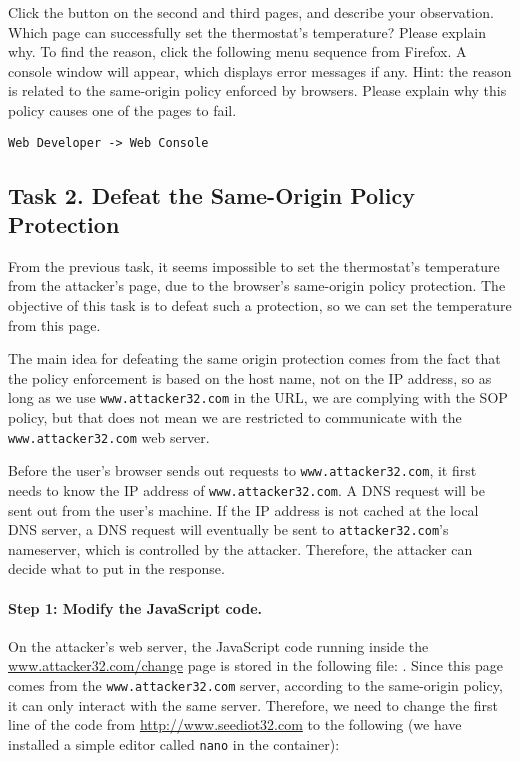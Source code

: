 Click the button on the second and third pages, and describe your observation. Which page
can successfully set the thermostat's temperature? Please explain why. 
To find the reason, click the following menu sequence from Firefox. A console window will appear,
which displays error messages if any. Hint: the reason is related to the same-origin policy 
enforced by browsers. Please explain why this policy causes one of the pages to fail.
 
\begin{lstlisting}
Web Developer -> Web Console
\end{lstlisting}
  


\subsection{Task 2. Defeat the Same-Origin Policy Protection}


From the previous task, it seems impossible to
set the thermostat's temperature from the attacker's
page, due to the browser's   
same-origin policy protection.  The objective of this task
is to defeat such a protection, so we can set the 
temperature from this page. 


The main idea for defeating the same origin protection 
comes from the fact that the policy enforcement is 
based on the host name, not on the IP address, so as long as 
we use \texttt{www.attacker32.com} in the URL, we are complying with
the SOP policy, but that does not mean we are restricted 
to communicate with the \texttt{www.attacker32.com} web server.  


Before the user's browser sends out requests to \texttt{www.attacker32.com},
it first needs to know the IP address of \texttt{www.attacker32.com}. 
A DNS request will be sent out from the user's machine. If the 
IP address is not cached at the local DNS server, a DNS request will
eventually be sent to \texttt{attacker32.com}'s  nameserver, which 
is controlled by the attacker. 
Therefore, the attacker can decide what to put in the response. 


\paragraph{Step 1: Modify the JavaScript code.}
On the attacker's web server, the JavaScript code running inside the 
\url{www.attacker32.com/change} page is 
stored in the following file: 
. Since this page
comes from the \texttt{www.attacker32.com} server, 
according to the same-origin policy, it can only
interact with the same server. Therefore, we need to change the first 
line of the code from \url{http://www.seediot32.com} 
to the following (we have installed a simple editor called \texttt{nano}
in the container):

